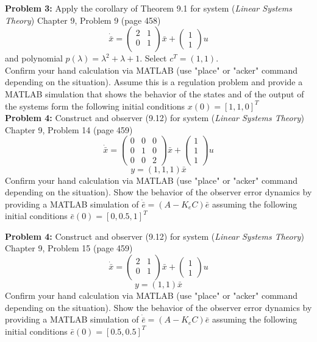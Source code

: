\documentclass[12pt]{article}
\begin{document}
\noindent
\textbf{Problem 3:} Apply the corollary of Theorem 9.1 for system ({\em Linear Systems Theory}) Chapter 9, Problem 9 (page 458)
$$
\dot{\bar{x}}=
\begin{pmatrix}
	2 & 1 \\
	0 & 1 \\
\end{pmatrix}
\bar{x}+
\begin{pmatrix}
	1 \\
	1
\end{pmatrix} u
$$
and polynomial $p(\lambda)=\lambda^2+\lambda+1$. Select $c^T=(1, 1)$.\\
Confirm your hand calculation via MATLAB (use "place" or "acker" command depending on the situation). Assume this is a regulation problem and provide a MATLAB simulation that shows the behavior of the states and of the output of the systems form the following initial conditions $x(0)=[1,1,0]^T$\\

\noindent
\textbf{Problem 4:} Construct and observer (9.12) for system ({\em Linear Systems Theory}) Chapter 9, Problem 14 (page 459)
$$
\dot{\bar{x}}=
\begin{pmatrix}
	0 & 0 & 0 \\
	0 & 1 & 0 \\
	0 & 0 & 2
\end{pmatrix}
\bar{x}+
\begin{pmatrix}
	1 \\
	1 \\
	1
\end{pmatrix} u
$$
$$y=(1,1,1)\bar{x}$$
Confirm your hand calculation via MATLAB (use "place" or "acker" command depending on the situation). Show the behavior of the observer error dynamics by providing a MATLAB simulation of $\dot{\bar{e}}=(A-K_eC)\bar{e}$ assuming the following initial conditions $\bar{e}(0)=[0,0.5,1]^T$

\noindent
\textbf{Problem 4:} Construct and observer (9.12) for system ({\em Linear Systems Theory}) Chapter 9, Problem 15 (page 459)
$$
\dot{\bar{x}}=
\begin{pmatrix}
	2 & 1 \\
	0 & 1 \\
\end{pmatrix}
\bar{x}+
\begin{pmatrix}
	1 \\
	1
\end{pmatrix} u
$$
$$y=(1,1)\bar{x}$$
Confirm your hand calculation via MATLAB (use "place" or "acker" command depending on the situation). Show the behavior of the observer error dynamics by providing a MATLAB simulation of $\dot{\bar{e}}=(A-K_eC)\bar{e}$ assuming the following initial conditions $\bar{e}(0)=[0.5, 0.5]^T$
\end{document}
